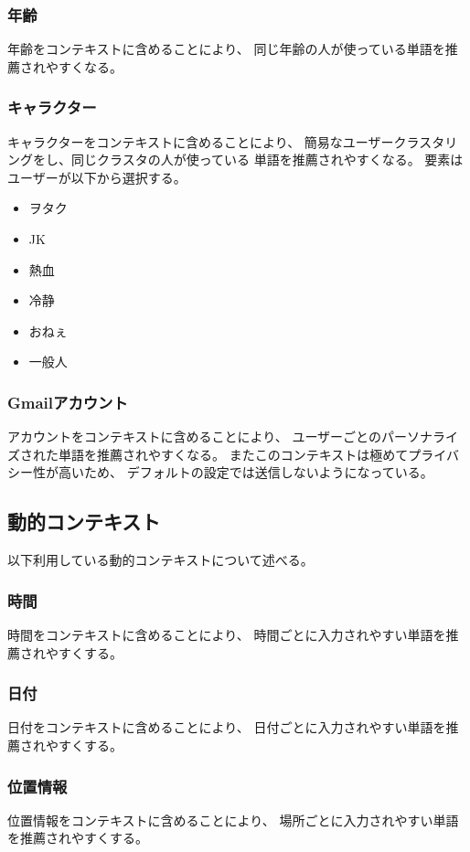 \subsubsection{年齢}
年齢をコンテキストに含めることにより、
同じ年齢の人が使っている単語を推薦されやすくなる。

\subsubsection{キャラクター}
キャラクターをコンテキストに含めることにより、
簡易なユーザークラスタリングをし、同じクラスタの人が使っている
単語を推薦されやすくなる。
要素はユーザーが以下から選択する。
\begin{itemize}
  \item ヲタク
  \item JK
  \item 熱血
  \item 冷静
  \item おねぇ
  \item 一般人
\end{itemize}

\subsubsection{Gmailアカウント}
アカウントをコンテキストに含めることにより、
ユーザーごとのパーソナライズされた単語を推薦されやすくなる。
またこのコンテキストは極めてプライバシー性が高いため、
デフォルトの設定では送信しないようになっている。

\subsection{動的コンテキスト}
\label{dynamiccontext}
以下利用している動的コンテキストについて述べる。

\subsubsection{時間}
時間をコンテキストに含めることにより、
時間ごとに入力されやすい単語を推薦されやすくする。

\subsubsection{日付}
日付をコンテキストに含めることにより、
日付ごとに入力されやすい単語を推薦されやすくする。

\subsubsection{位置情報}
位置情報をコンテキストに含めることにより、
場所ごとに入力されやすい単語を推薦されやすくする。

